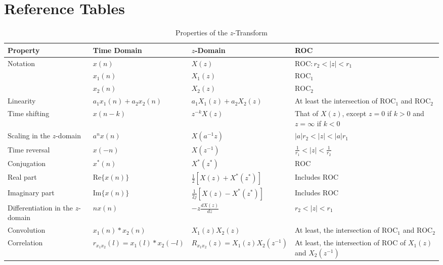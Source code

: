 \documentclass[12pt,a4paper]{article}
\begin{document}
\newpage

\section*{Reference Tables}

\begin{table}[H]
\centering
\caption{Properties of the $z$-Transform}
\label{tab:z_properties}
{\small
\setlength{\tabcolsep}{5pt}
\renewcommand{\arraystretch}{1.35}
\begin{tabular}{>{\raggedright\arraybackslash}p{3.0cm}>{\raggedright\arraybackslash}p{3.4cm}>{\raggedright\arraybackslash}p{4.5cm}>{\raggedright\arraybackslash}p{4.3cm}}
\hline
\textbf{Property} & \textbf{Time Domain} & \textbf{$z$-Domain} & \textbf{ROC} \\
\hline
Notation & $x(n)$ & $X(z)$ & $\text{ROC}: r_2 < |z| < r_1$ \\
 & $x_1(n)$ & $X_1(z)$ & $\text{ROC}_1$ \\
 & $x_2(n)$ & $X_2(z)$ & $\text{ROC}_2$ \\
Linearity & $a_1 x_1(n) + a_2 x_2(n)$ & $a_1 X_1(z) + a_2 X_2(z)$ & At least the intersection of $\text{ROC}_1$ and $\text{ROC}_2$ \\
Time shifting & $x(n - k)$ & $z^{-k}X(z)$ & That of $X(z)$, except $z = 0$ if $k > 0$ and $z = \infty$ if $k < 0$ \\
Scaling in the $z$-domain & $a^n x(n)$ & $X(a^{-1}z)$ & $|a|r_2 < |z| < |a|r_1$ \\
Time reversal & $x(-n)$ & $X(z^{-1})$ & $\frac{1}{r_1} < |z| < \frac{1}{r_2}$ \\[3pt]
Conjugation & $x^*(n)$ & $X^*(z^*)$ & $\text{ROC}$ \\
Real part & $\text{Re}\{x(n)\}$ & $\frac{1}{2}\left[X(z) + X^*(z^*)\right]$ & Includes $\text{ROC}$ \\[2pt]
Imaginary part & $\text{Im}\{x(n)\}$ & $\frac{1}{2j}\left[X(z) - X^*(z^*)\right]$ & Includes $\text{ROC}$ \\[3pt]
Differentiation in the $z$-domain & $nx(n)$ & $-z\frac{dX(z)}{dz}$ & $r_2 < |z| < r_1$ \\[3pt]
Convolution & $x_1(n) * x_2(n)$ & $X_1(z)X_2(z)$ & At least, the intersection of $\text{ROC}_1$ and $\text{ROC}_2$ \\
Correlation & $r_{x_1 x_2}(l) = x_1(l) * x_2(-l)$ & $R_{x_1 x_2}(z) = X_1(z)X_2(z^{-1})$ & At least, the intersection of $\text{ROC}$ of $X_1(z)$ and $X_2(z^{-1})$ \\

\end{tabular}}
\end{table}
\end{document}
